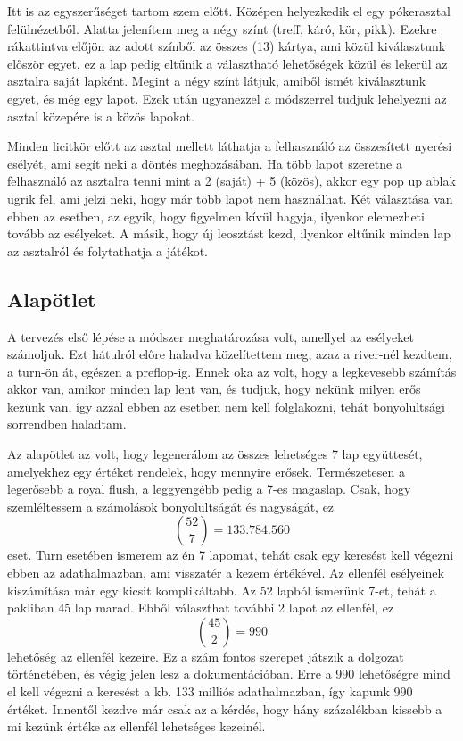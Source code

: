 Itt is az egyszerűséget tartom szem előtt. Középen helyezkedik el egy pókerasztal felülnézetből. Alatta jelenítem meg a négy színt (treff, káró, kör, pikk). Ezekre rákattintva előjön az adott színből az összes (13) kártya, ami közül kiválasztunk először egyet, ez a lap pedig eltűnik a választható lehetőségek közül és lekerül az asztalra saját lapként. Megint a négy színt látjuk, amiből ismét kiválasztunk egyet, és még egy lapot. Ezek után ugyanezzel a módszerrel tudjuk lehelyezni az asztal közepére is a közös lapokat.

Minden licitkör előtt az asztal mellett láthatja a felhasználó az összesített nyerési esélyét, ami segít neki a döntés meghozásában. Ha több lapot szeretne a felhasználó az asztalra tenni mint a 2 (saját) + 5 (közös), akkor egy pop up ablak ugrik fel, ami jelzi neki, hogy már több lapot nem használhat. Két választása van ebben az esetben, az egyik, hogy figyelmen kívül hagyja, ilyenkor elemezheti tovább az esélyeket. A másik, hogy új leosztást kezd, ilyenkor eltűnik minden lap az asztalról és folytathatja a játékot.

\subsection{Alapötlet}
A tervezés első lépése a módszer meghatározása volt, amellyel az esélyeket számoljuk. Ezt hátulról előre haladva közelítettem meg, azaz a river-nél kezdtem, a turn-ön át, egészen a preflop-ig. Ennek oka az volt, hogy a legkevesebb számítás akkor van, amikor minden lap lent van, és tudjuk, hogy nekünk milyen erős kezünk van, így azzal ebben az esetben nem kell folglakozni, tehát bonyolultsági sorrendben haladtam.

Az alapötlet az volt, hogy legenerálom az összes lehetséges 7 lap együttesét, amelyekhez egy értéket rendelek, hogy mennyire erősek. Természetesen a legerősebb a royal flush, a leggyengébb pedig a 7-es magaslap. Csak, hogy szemléltessem a számolások bonyolultságát és nagyságát, ez \[ \binom{52}{7}=133.784.560\] eset. Turn esetében ismerem az én 7 lapomat, tehát csak egy keresést kell végezni ebben az adathalmazban, ami visszatér a kezem értékével. Az ellenfél esélyeinek kiszámítása már egy kicsit komplikáltabb. Az 52 lapból ismerünk 7-et, tehát a pakliban 45 lap marad. Ebből választhat további 2 lapot az ellenfél, ez \[ \binom{45}{2}=990\] lehetőség az ellenfél kezeire. Ez a szám fontos szerepet játszik a dolgozat történetében, és végig jelen lesz a dokumentációban. Erre a 990 lehetőségre mind el kell végezni a keresést a kb. 133 milliós adathalmazban, így kapunk 990 értéket. Innentől kezdve már csak az a kérdés, hogy hány százalékban kissebb a mi kezünk értéke az ellenfél lehetséges kezeinél. 

